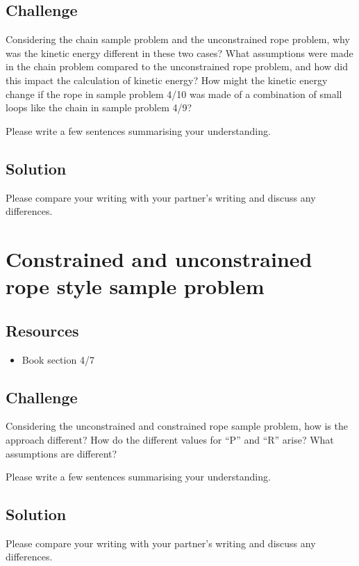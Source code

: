 \subsection*{Challenge}
Considering the chain sample problem and the unconstrained rope problem, why was the kinetic energy different in these two cases? What assumptions were made in the chain problem compared to the unconstrained rope problem, and how did this impact the calculation of kinetic energy? How might the kinetic energy change if the rope in sample problem 4/10 was made of a combination of small loops like the chain in sample problem 4/9?

Please write a few sentences summarising your understanding.

\subsection*{Solution}
Please compare your writing with your partner's writing and discuss any differences.




\newpage
\section{Constrained and unconstrained rope style sample problem}

\subsection*{Resources}
\begin{itemize}
    \item Book section 4/7
\end{itemize}

\subsection*{Challenge}
Considering the unconstrained and constrained rope sample problem, how is the approach different? How do the different values for ``P'' and ``R'' arise? What assumptions are different?

Please write a few sentences summarising your understanding.

\subsection*{Solution}
Please compare your writing with your partner's writing and discuss any differences.




